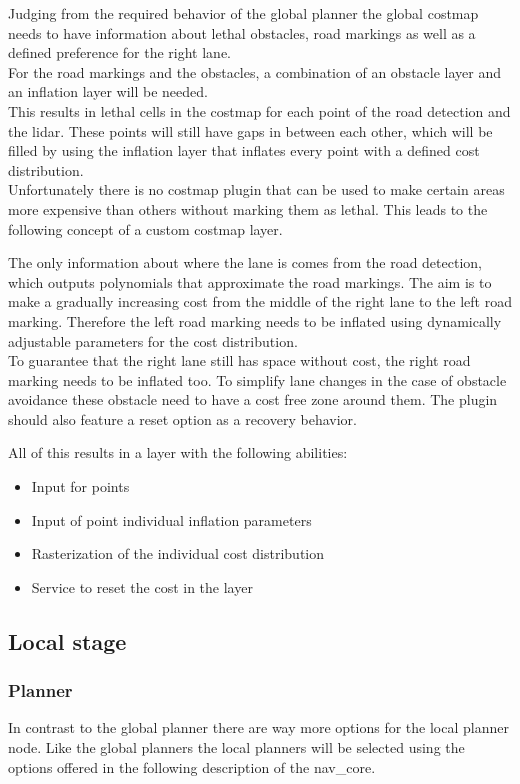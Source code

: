 Judging from the required behavior of the global planner the global costmap needs to have information about lethal obstacles, road markings as well as a defined preference for the right lane.\\

For the road markings and the obstacles, a combination of an obstacle layer and an inflation layer will be needed.\\
This results in lethal cells in the costmap for each point of the road detection and the lidar. These points will still have gaps in between each other, which will be filled by using the inflation layer that inflates every point with a defined cost distribution.\\

Unfortunately there is no costmap plugin that can be used to make certain areas more expensive than others without marking them as lethal. This leads to the following concept of a custom costmap layer.

The only information about where the lane is comes from the road detection, which outputs polynomials that approximate the road markings. The aim is to make a gradually increasing cost from the middle of the right lane to the left road marking. Therefore the left road marking needs to be inflated using dynamically adjustable parameters for the cost distribution.\\
To guarantee that the right lane still has space without cost, the right road marking needs to be inflated too. To simplify lane changes in the case of obstacle avoidance these obstacle need to have a cost free zone around them.
The plugin should also feature a reset option as a recovery behavior.

All of this results in a layer with the following abilities:

\begin{itemize}
	\item Input for points
	\item Input of point individual inflation parameters
	\item Rasterization of the individual cost distribution
	\item Service to reset the cost in the layer
\end{itemize}

\subsection{Local stage}
\subsubsection{Planner}
In contrast to the global planner there are way more options for the local planner node. Like the global planners the local planners will be selected using the options offered in the following description of the nav\_core\cite{navcore}.

